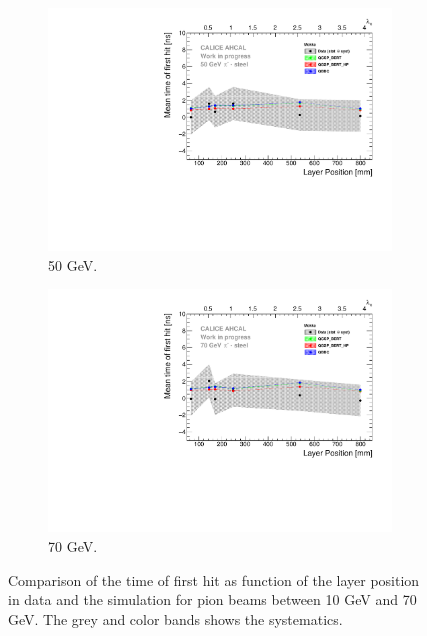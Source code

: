 \begin{figure}[htbp!]
\begin{subfigure}[t]{0.5\textwidth}
    \includegraphics[width=1\textwidth]{../Thesis_Plots/Timing/Pions/Plots/ComparisonToSim/Time_Depth_50GeV_Mokka.pdf}
    \caption{50 GeV.} \label{fig:Depth_SimData_50GeV}
  \end{subfigure}
  \hfill
  \begin{subfigure}[t]{0.5\textwidth}
    \centering
    \includegraphics[width=1\textwidth]{../Thesis_Plots/Timing/Pions/Plots/ComparisonToSim/Time_Depth_70GeV_Mokka.pdf}
    \caption{70 GeV.} \label{fig:Depth_SimData_70GeV}
  \end{subfigure}
  \caption{Comparison of the time of first hit as function of the layer position in data and the \mokka simulation for pion beams between 10 GeV and 70 GeV. The grey and color bands shows the systematics.}
\end{figure}

